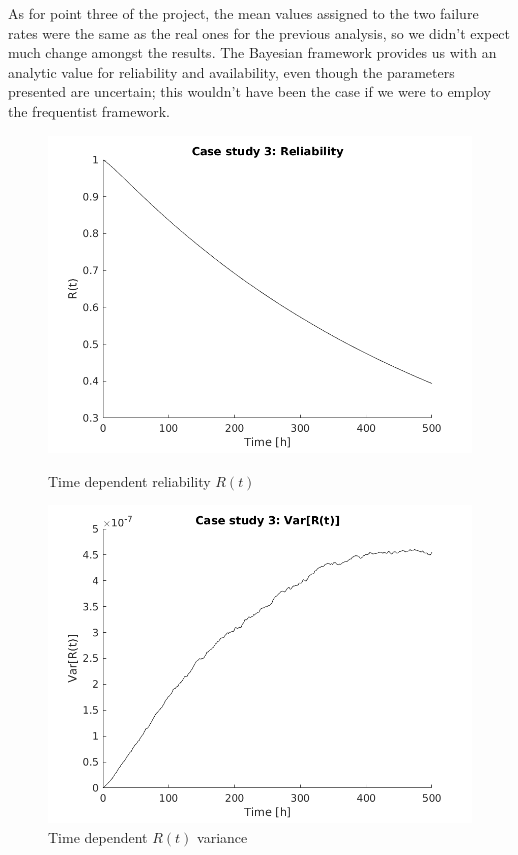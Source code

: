 \documentclass[a4paper,11pt]{article}
\begin{document}
As for point three of the project, the mean values assigned to the two failure
rates were the same as the real ones for the previous analysis, so we didn't
expect much change amongst the results. The Bayesian framework provides us with
an analytic value for reliability and availability, even though the parameters
presented are uncertain; this wouldn't have been the case if we were to employ
the frequentist framework.

\begin{figure}[ht]
    \centering
    \begin{minipage}{.5\textwidth}
        \centering
        \includegraphics[width=1\linewidth]{Rel3.png}
        \caption{Time dependent reliability $R(t)$}
    \end{minipage}%
    \begin{minipage}{.5\textwidth}
        \centering
        \includegraphics[width=1\linewidth]{Rel3_var.png}
        \caption{Time dependent $R(t)$ variance}
    \end{minipage}
\end{figure}
\end{document}
